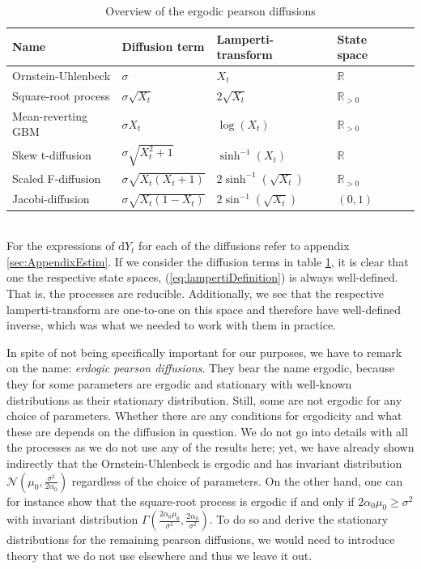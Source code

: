 \begin{table}[h!]
    \begin{center}
    \begin{tabular}{lllll}\hline
    \textbf{Name} & \textbf{Diffusion term} & \textbf{Lamperti-transform} & \textbf{State space}\\ \hline
    Ornstein-Uhlenbeck  & $\sigma$  & $X_t$ & $\mathbb{R}$ \\
    Square-root process & $\sigma\sqrt{X_t}$  & $ 2\sqrt{X_t}$ & $\mathbb{R}_{>0}$ \\
    Mean-reverting GBM  & $\sigma X_t $  & $ \log\left(X_t\right)$  & $\mathbb{R}_{>0}$ \\
    Skew t-diffusion  & $\sigma\sqrt{X_t^2 + 1}$  & $ \sinh^{-1}(X_t)$ & $\mathbb{R}$\\
    Scaled F-diffusion  & $\sigma\sqrt{X_t\left(X_t + 1\right)}$  & $ 2\sinh^{-1}\left(\sqrt{X_t}\right)$ & $\mathbb{R}_{>0}$ \\
    Jacobi-diffusion  & $\sigma\sqrt{X_t\left(1 - X_t\right)}$  & $ 2\sin^{-1}\left(\sqrt{X_t}\right)$ & $(0, 1)$ \\ \hline
    \end{tabular}
    \caption{Overview of the ergodic pearson diffusions}
    \label{table:ergodicDiffusions}
\end{center}
\end{table}\\
For the expressions of $\mathrm{d}Y_t$ for each of the diffusions refer to appendix \ref{sec:AppendixEstim}. If we consider the diffusion terms in table \ref{table:ergodicDiffusions}, it is clear that one the respective state spaces, (\ref{eq:lampertiDefinition}) is always well-defined. That is, the processes are reducible. Additionally, we see that the respective lamperti-transform are one-to-one on this space and therefore have well-defined inverse, which was what we needed to work with them in practice. 

In spite of not being specifically important for our purposes, we have to remark on the name: \textit{erdogic pearson diffusions}. They bear the name ergodic, because they for some parameters are ergodic and stationary with well-known distributions as their stationary distribution. Still, some are not ergodic for any choice of parameters. Whether there are any conditions for ergodicity and what these are depends on the diffusion in question. We do not go into details with all the processes as we do not use any of the results here; yet, we have already shown indirectly that the Ornstein-Uhlenbeck is ergodic and has invariant distribution $\mathcal{N}\left(\mu_0, \frac{\sigma^2}{2\alpha_0}\right)$ regardless of the choice of parameters. On the other hand, one can for instance show that the square-root process is ergodic if and only if $2\alpha_0\mu_0\geq \sigma^2$ with invariant distribution $\Gamma\left(\frac{2\alpha_0\mu_0}{\sigma^2}, \frac{2\alpha_0}{\sigma^2}\right)$. To do so and derive the stationary distributions for the remaining pearson diffusions, we would need to introduce theory that we do not use elsewhere and thus we leave it out. 

